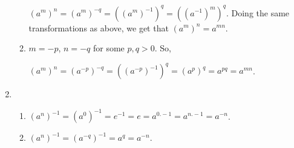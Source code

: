 \begin{enumerate}
\begin{enumerate}
            $ (a^m)^n = (a^m)^{-q} = ((a^m)^{-1})^q = ((a^{-1})^m)^q $. Doing the same transformations as above, we get that $ (a^m)^n = a^{mn} $.

            \item $ m = -p $, $ n = -q $ for some $  p, q > 0 $. So,

            $ (a^m)^n = (a^{-p})^{-q} = ((a^{-p})^{-1})^{q} = (a^{p})^{q} = a^{pq} = a^{mn} $.
        \end{enumerate}

    \item
        \begin{enumerate}
            \item $ (a^n)^{-1} = (a^0)^{-1} = e^{-1} = e = a^{0.-1} = a^{n.-1} = a^{-n}$.

            \item $ (a^n)^{-1} = (a^{-q})^{-1} = a^q = a^{-n}$.
        \end{enumerate}
\end{enumerate}

